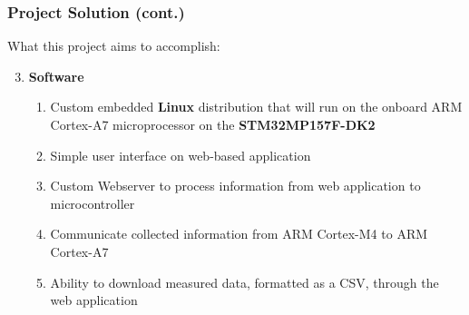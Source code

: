 \documentclass[8pt,compress,aspectratio=169]{beamer}
\newcommand\LightBold[1]{\textcolor{VSBlueLight}{\textbf{#1}}}
\newcommand\DarkBold[1]{\textcolor{VSBlueDark}{\textbf{#1}}}
\begin{document}
\begin{frame}
  \frametitle{Project Solution (cont.)}
  \begin{block}{What this project aims to accomplish:}
    \begin{enumerate}
        \setcounter{enumi}{2}
        \large
      \item \DarkBold{Software}
        \begin{enumerate}
            \large
          \item Custom embedded \textbf{Linux} distribution that will run on the onboard ARM Cortex-A7
            microprocessor on the \LightBold{STM32MP157F-DK2}
          \item Simple user interface on web-based application
          \item Custom Webserver to process information from web application to microcontroller
          \item Communicate collected information from ARM Cortex-M4 to ARM Cortex-A7
          \item Ability to download measured data, formatted as a CSV, through the web application 
        \end{enumerate}
    \end{enumerate}
  \end{block}
\end{frame}
\end{document}
